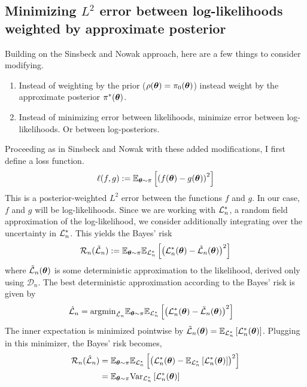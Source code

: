 \documentclass[12pt]{article}
\begin{document}
\subsection{Minimizing $L^2$ error between log-likelihoods weighted by approximate posterior}
Building on the Sinsbeck and Nowak approach, here are a few things to consider modifying. 
\begin{enumerate}
\item Instead of weighting by the prior ($\rho(\boldsymbol{\theta}) = \pi_0(\boldsymbol{\theta})$) instead weight by the approximate posterior $\pi^*(\boldsymbol{\theta})$. 
\item Instead of minimizing error between likelihoods, minimize error between log-likelihoods. Or between log-posteriors. 
\end{enumerate}

Proceeding as in Sinsbeck and Nowak with these added modifications, I first define a loss function. 
\begin{align*}
\ell(f, g) := \mathbb{E}_{\boldsymbol{\theta} \sim \pi} \left[\left(f(\boldsymbol{\theta}) - g(\boldsymbol{\theta}) \right)^2 \right]
\end{align*}
This is a posterior-weighted $L^2$ error between the functions $f$ and $g$. In our case, $f$ and $g$ will be log-likelihoods. Since we are working with 
$\mathcal{L}_n^*$, a random field approximation of the log-likelihood, we consider additionally integrating over the uncertainty in $\mathcal{L}_n^*$. This 
yields the Bayes' risk 
\begin{align*}
\mathcal{R}_n(\tilde{\mathcal{L}}_n) := \mathbb{E}_{\boldsymbol{\theta} \sim \pi} \mathbb{E}_{\mathcal{L}_n^*}\left[\left(\mathcal{L}_n^*(\boldsymbol{\theta}) - \tilde{\mathcal{L}}_n(\boldsymbol{\theta}) \right)^2 \right]
\end{align*}
where $\tilde{\mathcal{L}}_n(\boldsymbol{\theta})$ is some deterministic approximation to the likelihood, derived only using $\mathcal{D}_n$. The best deterministic approximation 
according to the Bayes' risk is given by 
\begin{align*}
\hat{\mathcal{L}}_n &= \text{argmin}_{\tilde{\mathcal{L}}_n} \mathbb{E}_{\boldsymbol{\theta} \sim \pi} \mathbb{E}_{\mathcal{L}_n^*}\left[\left(\mathcal{L}_n^*(\boldsymbol{\theta}) - \tilde{\mathcal{L}}_n(\boldsymbol{\theta}) \right)^2 \right]
\end{align*}
The inner expectation is minimized pointwise by $\tilde{\mathcal{L}}_n(\boldsymbol{\theta}) = \mathbb{E}_{\mathcal{L}_n^*}\left[\mathcal{L}_n^*(\boldsymbol{\theta}) \right]$. Plugging in this minimizer, the Bayes' 
risk becomes, 
\begin{align*}
\mathcal{R}_n(\hat{\mathcal{L}}_n) &=  \mathbb{E}_{\boldsymbol{\theta} \sim \pi} \mathbb{E}_{\mathcal{L}_n^*}\left[\left(\mathcal{L}_n^*(\boldsymbol{\theta}) - \mathbb{E}_{\mathcal{L}_n^*}\left[\mathcal{L}^*_n(\boldsymbol{\theta})\right] \right)^2 \right] \\
						      &= \mathbb{E}_{\boldsymbol{\theta} \sim \pi} \mathrm{Var}_{\mathcal{L}_n^*}\left[\mathcal{L}_n^*(\boldsymbol{\theta}) \right]
\end{align*}
\end{document}
